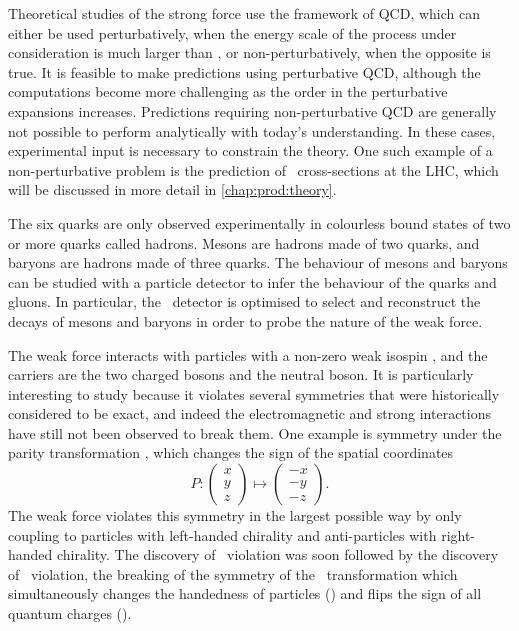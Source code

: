 Theoretical studies of the strong force use the framework of \ac{QCD}, which 
can either be used perturbatively, when the energy scale of the process under 
consideration is much larger than \qcdscale, or non-perturbatively, when the 
opposite is true.
It is feasible to make predictions using perturbative \ac{QCD}, although the 
computations become more challenging as the order in the perturbative 
expansions increases.
Predictions requiring non-perturbative \ac{QCD} are generally not possible to 
perform analytically with today's understanding.
In these cases, experimental input is necessary to constrain the theory.
One such example of a non-perturbative problem is the prediction of \pp\ 
cross-sections at the \ac{LHC}, which will be discussed in more detail in 
\cref{chap:prod:theory}.

The six quarks are only observed experimentally in colourless bound states of 
two or more quarks called hadrons.
Mesons are hadrons made of two quarks, and baryons are hadrons made of three 
quarks.
The behaviour of mesons and baryons can be studied with a particle detector to 
infer the behaviour of the quarks and gluons.
In particular, the \lhcb\ detector is optimised to select and reconstruct the 
decays of mesons and baryons in order to probe the nature of the weak force.

The weak force interacts with particles with a non-zero weak isospin \wisospin, 
and the carriers are the two charged \PWpm bosons and the neutral \PZ boson.
It is particularly interesting to study because it violates several symmetries 
that were historically considered to be exact, and indeed the electromagnetic 
and strong interactions have still not been observed to break them.
One example is symmetry under the parity transformation \Ptransform, which 
changes the sign of the spatial coordinates
\begin{equation}
  P: \begin{pmatrix}x\\y\\z\end{pmatrix}
     \mapsto \begin{pmatrix}-x\\-y\\-z\end{pmatrix}.
  \label{eqn:intro:sm:parity}
\end{equation}
The weak force violates this symmetry in the largest possible way by only 
coupling to particles with left-handed chirality and anti-particles with 
right-handed chirality.
The discovery of \Ptransform\ violation was soon followed by the discovery of 
\CP\ violation, the breaking of the symmetry of the \CP\ transformation which 
simultaneously changes the handedness of particles (\Ptransform) and flips the sign of all 
quantum charges (\Ctransform).

